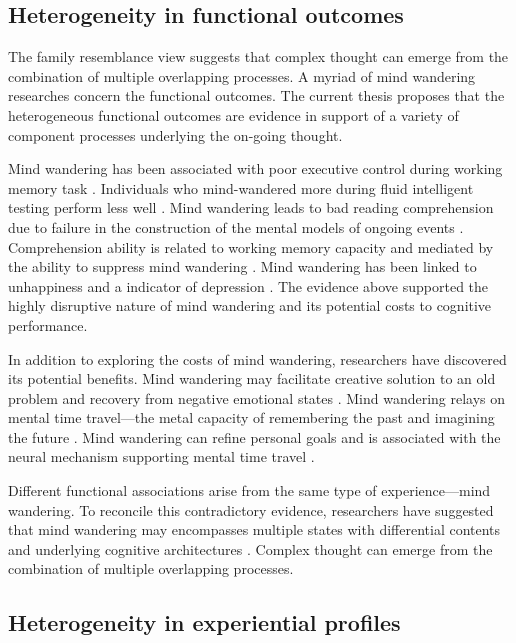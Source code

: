 \subsection{Heterogeneity in functional outcomes}

The family resemblance view suggests that complex thought can emerge from the combination of multiple overlapping processes. A myriad of mind wandering researches concern the functional outcomes. The current thesis proposes that the heterogeneous functional outcomes are evidence in support of a variety of component processes underlying the on-going thought. 

Mind wandering has been associated with poor executive control during working memory task \cite{McVayJOEP2009}. Individuals who mind-wandered more during fluid intelligent testing perform less well \cite{MrazekJoEP2012}. Mind wandering leads to bad reading comprehension due to failure in the construction of the mental models of ongoing events \cite{Smallwood2008}. Comprehension ability is related to working memory capacity and mediated by the ability to suppress mind wandering \cite{McVayReading2012, Unsworth2013}. Mind wandering has been linked to unhappiness \cite{Killingsworth2010} and a indicator of depression \cite{Smallwood2007}. The evidence above supported the highly disruptive nature of mind wandering and its potential costs to cognitive performance.

In addition to exploring the costs of mind wandering, researchers have discovered its potential benefits. Mind wandering may facilitate creative solution to an old problem \cite{Baird2012, Smeekens2016} and recovery from negative emotional states \cite{RubyPlos2013, PoerioFrontiers2016}. Mind wandering relays on mental time travel---the metal capacity of remembering the past and imagining the future \cite{Stawarczyk2015}.  Mind wandering can refine personal goals \cite{Medea2016} and is associated with the neural mechanism supporting mental time travel \cite{DArgembeau2006,DArgembeau2015}. 

Different functional associations arise from the same type of experience---mind wandering. To reconcile this contradictory evidence, researchers have suggested that mind wandering may encompasses multiple states with differential contents and underlying cognitive architectures \cite{SmallwoodFrontiers2013}. Complex thought can emerge from the combination of multiple overlapping processes. 

\subsection{Heterogeneity in experiential profiles}

